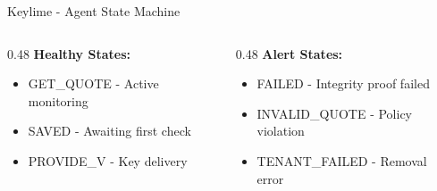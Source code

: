 \begin{frame}{Keylime - Agent State Machine}
  \vspace{0.1cm}

  \begin{columns}[T]
    \begin{column}{0.48\textwidth}
      \scriptsize
      \textbf{Healthy States:}
      \begin{itemize}
        \item \textcolor{keylimegreen}{GET\_QUOTE} - Active monitoring
        \item SAVED - Awaiting first check
        \item PROVIDE\_V - Key delivery
      \end{itemize}
    \end{column}
    \begin{column}{0.48\textwidth}
      \scriptsize
      \textbf{Alert States:}
      \begin{itemize}
        \item \textcolor{dangered}{FAILED} - Integrity proof failed
        \item \textcolor{dangered}{INVALID\_QUOTE} - Policy violation
        \item \textcolor{dangered}{TENANT\_FAILED} - Removal error
      \end{itemize}
    \end{column}
  \end{columns}
\end{frame}

